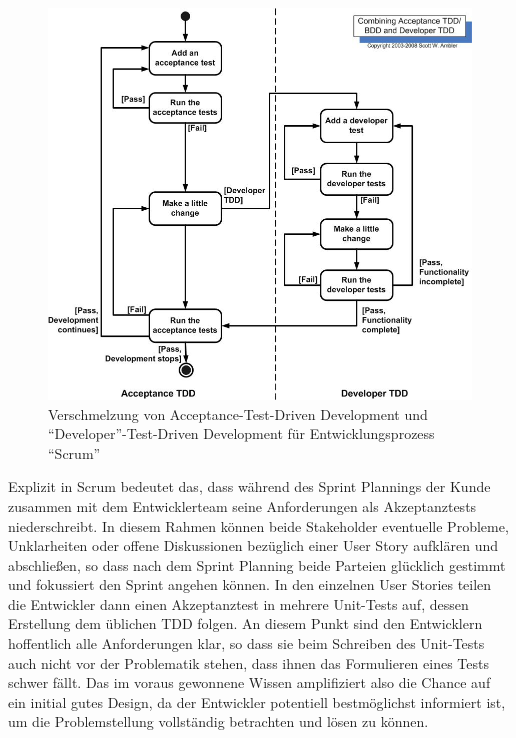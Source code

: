 \documentclass[12pt,DIV14,BCOR10mm,a4paper,twoside,parskip=half-,headsepline,headinclude,english,ngerman,bibliography=totocnumbered]{scrreprt}
\begin{document}
\begin{figure}[!htb]
    \includegraphics[width=\textwidth,height=0.8\textheight,keepaspectratio]{./images/atdd.jpg}
    \caption{Verschmelzung von Acceptance-Test-Driven Development und \enquote{Developer}-Test-Driven Development für Entwicklungsprozess \enquote{Scrum} \autocite{astels_2003}}
    \label{figure:atdd-dtdd}
\end{figure}

Explizit in Scrum bedeutet das, dass während des Sprint Plannings der Kunde zusammen mit dem Entwicklerteam seine Anforderungen als Akzeptanztests niederschreibt.
In diesem Rahmen können beide Stakeholder eventuelle Probleme, Unklarheiten oder offene Diskussionen bezüglich einer User Story aufklären und abschließen, so dass nach dem Sprint Planning beide Parteien glücklich gestimmt und fokussiert den Sprint angehen können.
In den einzelnen User Stories teilen die Entwickler dann einen Akzeptanztest in mehrere Unit-Tests auf, dessen Erstellung dem üblichen TDD folgen.
An diesem Punkt sind den Entwicklern hoffentlich alle Anforderungen klar, so dass sie beim Schreiben des Unit-Tests auch nicht vor der Problematik stehen, dass ihnen das Formulieren eines Tests schwer fällt.
Das im voraus gewonnene Wissen amplifiziert also die Chance auf ein initial gutes Design, da der Entwickler potentiell bestmöglichst informiert ist, um die Problemstellung vollständig betrachten und lösen zu können.
\end{document}
